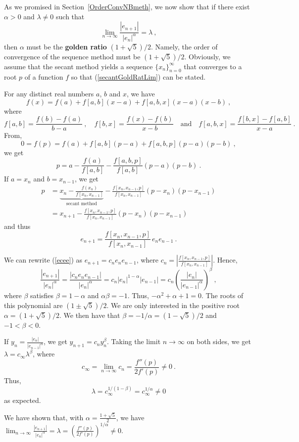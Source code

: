 \begin{rmk}
As we promised in Section~\ref{OrderConvNBmeth}, we now show that
if there exist $\alpha>0$ and $\lambda \neq 0$ such that
\begin{equation} \label{secantGoldRatLim}
\lim_{n\rightarrow \infty} \frac{|e_{n+1}|}{|e_n|^\alpha} = \lambda \ ,
\end{equation}
then $\alpha$ must be the {\bfseries golden ratio}
$(1+\sqrt{5})/2$.  Namely, the order of convergence of the sequence method
must be $(1+\sqrt{5})/2$.  Obviously, we assume that the secant method
yields a sequence $\displaystyle \{ x_n\}_{n=0}^\infty$ that converges
to a root $p$ of a function $f$ so that (\ref{secantGoldRatLim}) can
be stated.

For any distinct real numbers $a$, $b$ and $x$, we have
\[
f(x) = f(a) + f[a,b] (x-a) + f[a,b,x](x-a)(x-b) \ ,
\]
where
\[
f[a,b] = \frac{f(b)-f(a)}{b-a} \ , \quad
f[b,x] = \frac{f(x)-f(b)}{x-b}
\quad \text{and} \quad
f[a,b,x] = \frac{f[b,x] - f[a,b]}{x-a} \ .
\]
From,
\[
0 = f(p) = f(a) + f[a,b] (p-a) + f[a,b,p](p-a)(p-b) \ ,
\]
we get
\[
p = a - \frac{f(a)}{f[a,b]} - \frac{f[a,b,p]}{f[a,b]}(p-a)(p-b) \ .
\]
If $a=x_n$ and $b=x_{n-1}$, we get
\begin{align*}
p &= \underbrace{x_n - \frac{f(x_n)}{f[x_n,x_{n-1}]}}_{\text{secant method}}
 - \frac{f[x_n,x_{n-1},p]}{f[x_n,x_{n-1}]}(p-x_n)(p-x_{n-1}) \\
&= x_{n+1} - \frac{f[x_n,x_{n-1},p]}{f[x_n,x_{n-1}]}(p-x_n)(p-x_{n-1})
\end{align*}
and thus
\begin{equation} \label{ecee}
e_{n+1} = \frac{f[x_n,x_{n-1},p]}{f[x_n,x_{n-1}]} \, e_n e_{n-1} \ .
\end{equation}

We can rewrite (\ref{ecee}) as $e_{n+1} = c_n e_n e_{n-1}$, where
$\displaystyle c_n = \left| \frac{f[x_n,x_{n-1},p]}{f[x_n,x_{n-1}]} \right|$.
Hence,
\[
\frac{|e_{n+1}|}{|e_n|^\alpha} 
= \frac{|c_n e_n e_{n-1}|}{|e_n|^\alpha}
= c_n |e_n|^{1-\alpha} |e_{n-1}|
= c_n \left( \frac{|e_n|}{|e_{n-1}|^\alpha} \right)^\beta \ ,
\]
where $\beta$ satisfies $\beta=1-\alpha$ and $\alpha\beta=-1$.
Thus, $-\alpha^2 + \alpha + 1 = 0$.  The roots of this polynomial are
$(1\pm \sqrt{5})/2$.  We are only interested in the positive root
$\alpha = (1 + \sqrt{5})/2$.   We then have that
$\beta = -1/\alpha = (1 -\sqrt{5})/2$
and $-1 < \beta <0$.

If $\displaystyle y_n = \frac{|e_n|}{|e_{n-1}|^\alpha}$, we get
$y_{n+1} = c_n y_n^\beta$.  Taking the limit $n\rightarrow \infty$ on
both sides, we get $\lambda = c_\infty \lambda^\beta$, where
\[
c_\infty = \lim_{n\rightarrow \infty} c_n = \frac{f''(p)}{2f'(p)} \neq 0 \ .
\]
Thus,
\[
  \lambda = c_\infty^{1/(1-\beta)} = c_\infty^{1/\alpha} \neq 0
\]
as expected.

We have shown that, with
$\displaystyle \alpha = \frac{1 + \sqrt{5}}{2}$, we have
$\displaystyle
\lim_{n\rightarrow \infty} \frac{|e_{n+1}|}{|e_n|^\alpha} =
\lambda =  \left(\frac{f''(p)}{2f'(p)}\right)^{1/\alpha} \neq 0$.
\label{bisOrderGold}
\end{rmk}

